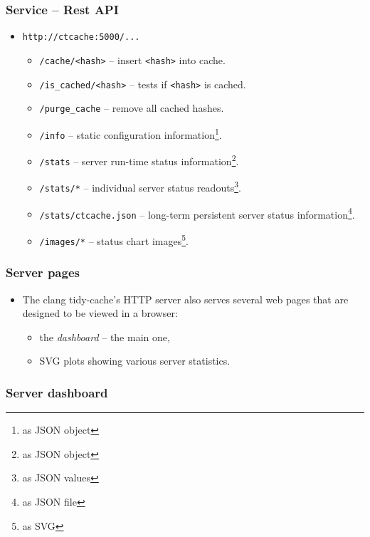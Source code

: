 \documentclass[compress,table,xcolor=table]{beamer}
\begin{document}
\begin{frame}[fragile]
  \frametitle{Service -- Rest API}
    \large
    \begin{itemize}
    \item \texttt{http://ctcache:5000/...}
    \begin{itemize}
    \normalsize
    \item \texttt{/cache/<hash>} -- insert \texttt{<hash>} into cache.
    \item \texttt{/is\_cached/<hash>} -- tests if \texttt{<hash>} is cached.
    \item \texttt{/purge\_cache} -- remove all cached hashes.
    \item \texttt{/info} -- static configuration information\footnote{as JSON object}.
    \item \texttt{/stats} -- server run-time status information\footnote{as JSON object}.
    \item \texttt{/stats/*} -- individual server status readouts\footnote{as JSON values}.
    \item \texttt{/stats/ctcache.json} -- long-term persistent server status information\footnote{as JSON file}.
    \item \texttt{/images/*} -- status chart images\footnote{as SVG}.
    \end{itemize}
    \end{itemize}
\end{frame}
\begin{frame}
  \frametitle{Server pages}
  \LARGE
  \begin{itemize}
  \item The clang tidy-cache's HTTP server also serves several web pages
    that are designed to be viewed in a browser:
    \begin{itemize}
        \item the {\em dashboard} -- the main one,
        \item SVG plots showing various server statistics.
    \end{itemize}
  \end{itemize}
\end{frame}
\begin{frame}
  \frametitle{Server dashboard}
\end{frame}
\end{document}
